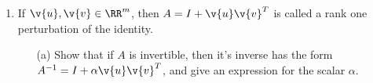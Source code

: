 \documentclass[11pt]{article}
\begin{document}
\begin{enumerate}
\begin{enumerate}
                \begin{proof}
                    Let $\lambda_x$ and $\lambda_y$ be the eigenvalues corresponding
                    to $\v{x}$ and $\v{y}$ respectively, that is
                    $A\v{x} = \lambda_x\v{x}$, $A\v{y} = \lambda_y\v{y}$, and
                    $\lambda_x \neq \lambda_y$.
                    Since $A$ is Hermitian, we have just shown that
                    $\lambda_x, \lambda_y \in \RR$.
                    Also because $A$ is Hermitian
                    \begin{align*}
                        A &= A^* \\
                        \v{x}^* A &= \v{x}^* A^* \\
                        \v{x}^* A &= \p{A\v{x}}^*.
                        \intertext{Since $\v{x}$ is an eigenvector}
                        \v{x}^* A &= \p{\lambda_x \v{x}}^*
                        \intertext{Since $\lambda_x \in \RR$}
                        \v{x}^* A &= \lambda_x \v{x}^* \\
                        \v{x}^* A \v{y} &= \lambda_x \v{x}^* \v{y} \\
                        \v{x}^* \lambda_y \v{y} &= \lambda_x \v{x}^* \v{y} \\
                        \p{\lambda_y - \lambda_x} \v{x}^* \v{y} &= 0
                        \intertext{Since $\lambda_x \neq \lambda_y$, $\lambda_y - \lambda_x \neq 0$.}
                        \v{x}^* \v{y} &= 0
                    \end{align*}
                    Therefore $\v{x}$ and $\v{y}$ are orthogonal.
                \end{proof}
        \end{enumerate}

    \item %
        If $\v{u}, \v{v} \in \RR^m$, then $A = I + \v{u}\v{v}^T$ is called a
        rank one perturbation of the identity.
        \begin{enumerate}
            \item[(a)]
                Show that if $A$ is invertible, then it's inverse has the form
                $A^{-1} = I + \alpha \v{u}\v{v}^T$, and give an expression for
                the scalar $\alpha$.


\end{enumerate}
\end{enumerate}
\end{document}
